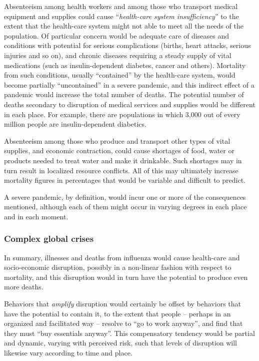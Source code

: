 \documentclass[12pt, a4]{scrartcl}
\begin{document}
Absenteeism among health workers and among those who transport medical equipment and supplies could cause “\emph{health-care system insufficiency}” to the extent that the health-care system might not able to meet all the needs of the population. Of particular concern would be adequate care of diseases and conditions with potential for serious complications (births, heart attacks, serious injuries and so on), and chronic diseases requiring a steady supply of vital medications (such as insulin-dependent diabetes, cancer and others). Mortality from such conditions, usually “contained” by the health-care system, would become partially “uncontained” in a severe pandemic, and this indirect effect of a pandemic would increase the total number of deaths. The potential number of deaths secondary to disruption of medical services and supplies would be different in each place. For example, there are populations in which 3,000 out of every million people are insulin-dependent diabetics.

Absenteeism among those who produce and transport other types of vital supplies, and economic contraction, could cause shortages of food, water or products needed to treat water and make it drinkable. Such shortages may in turn result in localized resource conflicts. All of this may ultimately increase mortality figures in percentages that would be variable and difficult to predict.

A severe pandemic, by definition, would incur one or more of the consequences mentioned, although each of them might occur in varying degrees in each place and in each moment.

\subsubsection{Complex global crises}

In summary, illnesses and deaths from influenza would cause health-care and socio-economic disruption, possibly in a non-linear fashion with respect to mortality, and this disruption would in turn have the potential to produce even more deaths.

Behaviors that \emph{amplify} disruption would certainly be offset by behaviors that have the potential to contain it, to the extent that people – perhaps in an organized and facilitated way – resolve to “go to work anyway”, and find that they must “buy essentials anyway”. This compensatory tendency would be partial and dynamic, varying with perceived risk, such that levels of disruption will likewise vary according to time and place.
\end{document}
